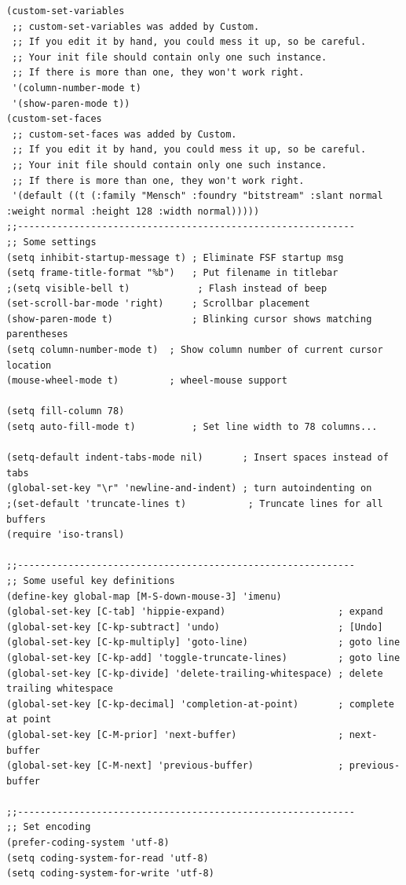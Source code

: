 \documentclass[12pt,spanish,]{article}
\begin{document}
\begin{verbatim}
(custom-set-variables
 ;; custom-set-variables was added by Custom.
 ;; If you edit it by hand, you could mess it up, so be careful.
 ;; Your init file should contain only one such instance.
 ;; If there is more than one, they won't work right.
 '(column-number-mode t)
 '(show-paren-mode t))
(custom-set-faces
 ;; custom-set-faces was added by Custom.
 ;; If you edit it by hand, you could mess it up, so be careful.
 ;; Your init file should contain only one such instance.
 ;; If there is more than one, they won't work right.
 '(default ((t (:family "Mensch" :foundry "bitstream" :slant normal :weight normal :height 128 :width normal)))))
;;------------------------------------------------------------
;; Some settings
(setq inhibit-startup-message t) ; Eliminate FSF startup msg
(setq frame-title-format "%b")   ; Put filename in titlebar
;(setq visible-bell t)            ; Flash instead of beep
(set-scroll-bar-mode 'right)     ; Scrollbar placement
(show-paren-mode t)              ; Blinking cursor shows matching parentheses
(setq column-number-mode t)  ; Show column number of current cursor location
(mouse-wheel-mode t)         ; wheel-mouse support

(setq fill-column 78)
(setq auto-fill-mode t)          ; Set line width to 78 columns...

(setq-default indent-tabs-mode nil)       ; Insert spaces instead of tabs
(global-set-key "\r" 'newline-and-indent) ; turn autoindenting on
;(set-default 'truncate-lines t)           ; Truncate lines for all buffers
(require 'iso-transl)

;;------------------------------------------------------------
;; Some useful key definitions
(define-key global-map [M-S-down-mouse-3] 'imenu)
(global-set-key [C-tab] 'hippie-expand)                    ; expand
(global-set-key [C-kp-subtract] 'undo)                     ; [Undo]
(global-set-key [C-kp-multiply] 'goto-line)                ; goto line
(global-set-key [C-kp-add] 'toggle-truncate-lines)         ; goto line
(global-set-key [C-kp-divide] 'delete-trailing-whitespace) ; delete trailing whitespace
(global-set-key [C-kp-decimal] 'completion-at-point)       ; complete at point
(global-set-key [C-M-prior] 'next-buffer)                  ; next-buffer
(global-set-key [C-M-next] 'previous-buffer)               ; previous-buffer

;;------------------------------------------------------------
;; Set encoding
(prefer-coding-system 'utf-8)
(setq coding-system-for-read 'utf-8)
(setq coding-system-for-write 'utf-8)


\end{verbatim}
\end{document}
